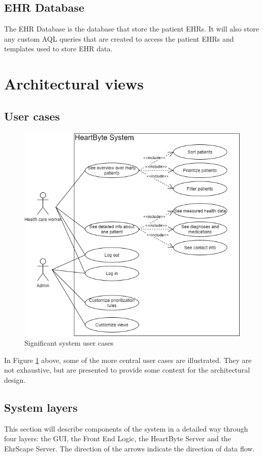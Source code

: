 \documentclass{article}
\begin{document}
\subsection{EHR Database}
The EHR Database is the database that store the patient EHRs. It will also store any custom AQL queries that are created to access the patient EHRs and templates used to store EHR data.


\section{Architectural views}
\subsection{User cases}
\begin{figure}[h]
    \centering
    \includegraphics[scale = 0.5]{user-cases}
    \caption{Significant system user cases}
    \label{fig:user-cases}
\end{figure}

In Figure \ref{fig:user-cases} above, some of the more central user cases are illustrated. They are not exhaustive, but are presented to provide some context for the architectural design.

\subsection{System layers}
This section will describe components of the system in a detailed way through four layers: the GUI, the Front End Logic, the HeartByte Server and the EhrScape Server. The direction of the arrows indicate the direction of data flow.
\end{document}
